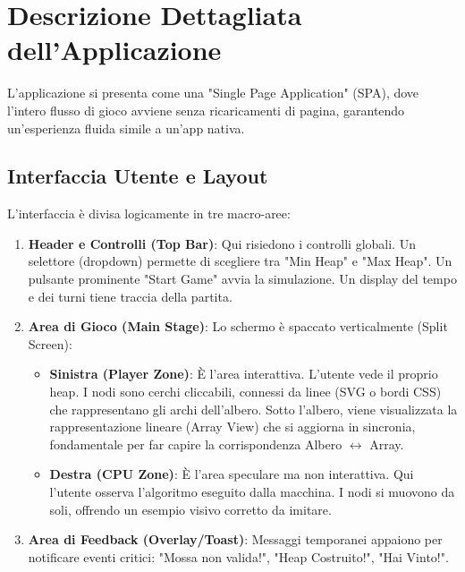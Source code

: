 \documentclass[openany]{theme/uniprthesis}
\begin{document}
\section{Descrizione Dettagliata dell'Applicazione}
L'applicazione si presenta come una "Single Page Application" (SPA), dove l'intero flusso di gioco avviene senza ricaricamenti di pagina, garantendo un'esperienza fluida simile a un'app nativa.

\subsection{Interfaccia Utente e Layout}
L'interfaccia è divisa logicamente in tre macro-aree:
\begin{enumerate}
    \item \textbf{Header e Controlli (Top Bar)}:
    Qui risiedono i controlli globali. Un selettore (dropdown) permette di scegliere tra "Min Heap" e "Max Heap". Un pulsante prominente "Start Game" avvia la simulazione. Un display del tempo e dei turni tiene traccia della partita.
    
    \item \textbf{Area di Gioco (Main Stage)}:
    Lo schermo è spaccato verticalmente (Split Screen):
    \begin{itemize}
        \item \textbf{Sinistra (Player Zone)}: È l'area interattiva. L'utente vede il proprio heap. I nodi sono cerchi cliccabili, connessi da linee (SVG o bordi CSS) che rappresentano gli archi dell'albero. Sotto l'albero, viene visualizzata la rappresentazione lineare (Array View) che si aggiorna in sincronia, fondamentale per far capire la corrispondenza Albero $\leftrightarrow$ Array.
        \item \textbf{Destra (CPU Zone)}: È l'area speculare ma non interattiva. Qui l'utente osserva l'algoritmo eseguito dalla macchina. I nodi si muovono da soli, offrendo un esempio visivo corretto da imitare.
    \end{itemize}

    \item \textbf{Area di Feedback (Overlay/Toast)}:
    Messaggi temporanei appaiono per notificare eventi critici: "Mossa non valida!", "Heap Costruito!", "Hai Vinto!".
\end{enumerate}
\end{document}
